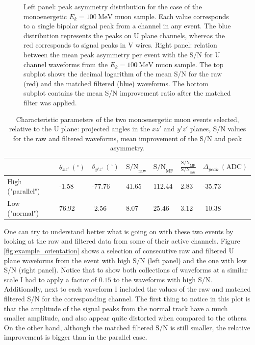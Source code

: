 \begin{figure}[t]
	\caption[Distribution of the peak asymmetry for the monoenergetic muon sample and dependence of the S/N change on the mean peak asymmetry of the event.]{Left panel: peak asymmetry distribution for the case of the monoenergetic $E_{k} = 100 \ \mathrm{MeV}$ muon sample. Each value corresponds to a single bipolar signal peak from a channel in any event. The blue distribution represents the peaks on U plane channels, whereas the red corresponds to signal peaks in V wires. Right panel: relation between the mean peak asymmetry per event with the S/N for U channel waveforms from the $E_{k} = 100 \ \mathrm{MeV}$ muon sample. The top subplot shows the decimal logarithm of the mean S/N for the raw (red) and the matched filtered (blue) waveforms. The bottom subplot contains the mean S/N improvement ratio after the matched filter was applied.}
	\label{fig:asymmetry}
\end{figure}

\begin{table}[h!]
	\centering
	\caption[Characteristic parameters of the two monoenergetic muon events selected for the peak asymmetry study.]{Characteristic parameters of the two monoenergetic muon events selected, relative to the U plane: projected angles in the $xz'$ and $y'z'$ planes, S/N values for the raw and filtered waveforms, mean improvement of the S/N and peak asymmetry.}
	\begin{tabular}{l|llllll}
		& $\theta_{xz'} \ (^{\circ})$ & $\theta_{y'z'} \ (^{\circ})$ & $\mathrm{S/N}_{\mathrm{raw}}$ & $\mathrm{S/N}_{\mathrm{MF}}$ & $\frac{\mathrm{S/N}_{\mathrm{MF}}}{\mathrm{S/N}_{\mathrm{raw}}}$ & $\Delta_{peak} \ (\mathrm{ADC})$ \\ \hline
		High ("parallel") & -1.58                     & -77.76                     & 41.65       & 112.44      & 2.83                          & -35.73                                                          \\
		Low ("normal")  & 76.92                     & -2.56                      & 8.07        & 25.46       & 3.12                          & -10.38                                                         
	\end{tabular}
	\label{tab:case}
\end{table}

One can try to understand better what is going on with these two events by looking at the raw and filtered data from some of their active channels. Figure \ref{fig:example_orientation} shows a selection of consecutive raw and filtered U plane waveforms from the event with high S/N (left panel) and the one with low S/N (right panel). Notice that to show both collections of waveforms at a similar scale I had to apply a factor of $0.15$ to the waveforms with high S/N. Additionally, next to each waveform I included the values of the raw and matched filtered S/N for the corresponding channel. The first thing to notice in this plot is that the amplitude of the signal peaks from the normal track have a much smaller amplitude, and also appear quite distorted when compared to the others. On the other hand, although the matched filtered S/N is still smaller, the relative improvement is bigger than in the parallel case.

